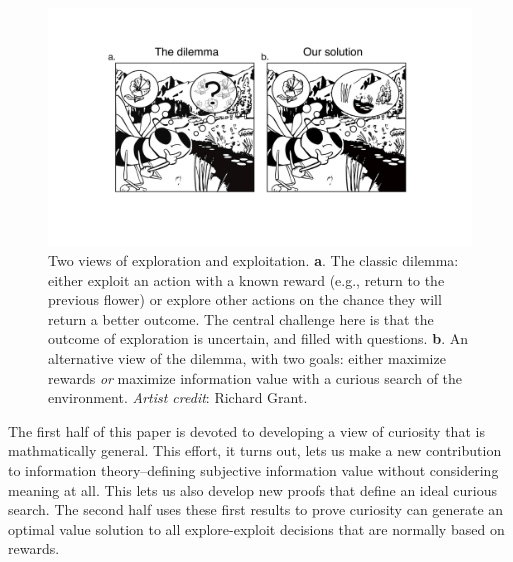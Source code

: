 \begin{figure}
	\begin{fullwidth}
	\includegraphics[width=.55\linewidth]{dilemma-draft-elife/img/bee.pdf} 
	\caption{Two views of exploration and exploitation. \textbf{a}. The classic dilemma: either exploit an action with a known reward (e.g., return to the previous flower) or explore other actions on the chance they will return a better outcome. The central challenge here is that the outcome of exploration is uncertain, and filled with questions. \textbf{b}. An alternative view of the dilemma, with two goals: either maximize rewards \textit{or} maximize information value with a curious search of the environment. \textit{Artist credit}: Richard Grant.}
	\label{fig:bee} 
	\end{fullwidth}
\end{figure}

The first half of this paper is devoted to developing a view of curiosity that is mathmatically general. This effort, it turns out, lets us make a new contribution to information theory--defining subjective information value without considering meaning at all. This lets us also develop new proofs that define an ideal curious search. The second half uses these first results to prove curiosity can generate an optimal value solution to all explore-exploit decisions that are normally based on rewards.
